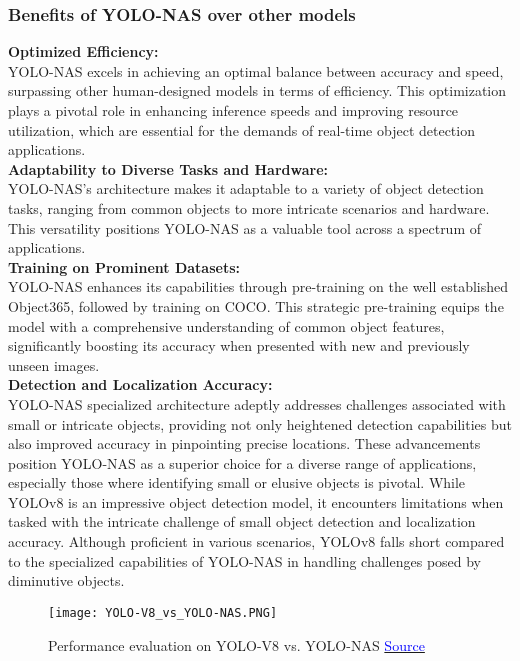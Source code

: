 \subsubsection{Benefits of YOLO-NAS over other models}
\textbf{Optimized Efficiency: }\\
YOLO-NAS excels in achieving an optimal balance between accuracy and speed, surpassing other human-designed models in terms of efficiency. This optimization plays a pivotal role in enhancing inference speeds and improving resource utilization, which are essential for the demands of real-time object detection applications.\\
\textbf{Adaptability to Diverse Tasks and Hardware: }\\
YOLO-NAS’s architecture makes it adaptable to a variety of object detection tasks, ranging from common objects to more intricate scenarios and hardware. This versatility positions YOLO-NAS as a valuable tool across a spectrum of applications.\\
\textbf{Training on Prominent Datasets: }\\
YOLO-NAS enhances its capabilities through pre-training on the well established Object365, followed by training on COCO. This strategic pre-training equips the model with a comprehensive understanding of common object features, significantly boosting its accuracy when presented with new and previously unseen images.\\
\textbf{Detection and Localization Accuracy: }\\
YOLO-NAS specialized architecture adeptly addresses challenges associated with small or intricate objects, providing not only heightened detection capabilities but also improved accuracy in pinpointing precise locations. These advancements position YOLO-NAS as a superior choice for a diverse range of applications, especially those where identifying small or elusive objects is pivotal. While YOLOv8 is an impressive object detection model, it encounters limitations when tasked with the intricate challenge of small object detection and localization accuracy. Although proficient in various scenarios, YOLOv8 falls short compared to the specialized capabilities of YOLO-NAS in handling challenges posed by diminutive objects. \cite{yolo-nas-vs-yolov8}
\begin{figure}[H]
    \centering
    \texttt{[image: YOLO-V8\_vs\_YOLO-NAS.PNG]}
    \caption{Performance evaluation on YOLO-V8 vs. YOLO-NAS \href{https://www.youtube.com/watch?v=uPgE8G4CGF4}{\textcolor{blue}{Source}}}
    \label{Yolo-V8_vs_YOLO-NAS}
\end{figure}


